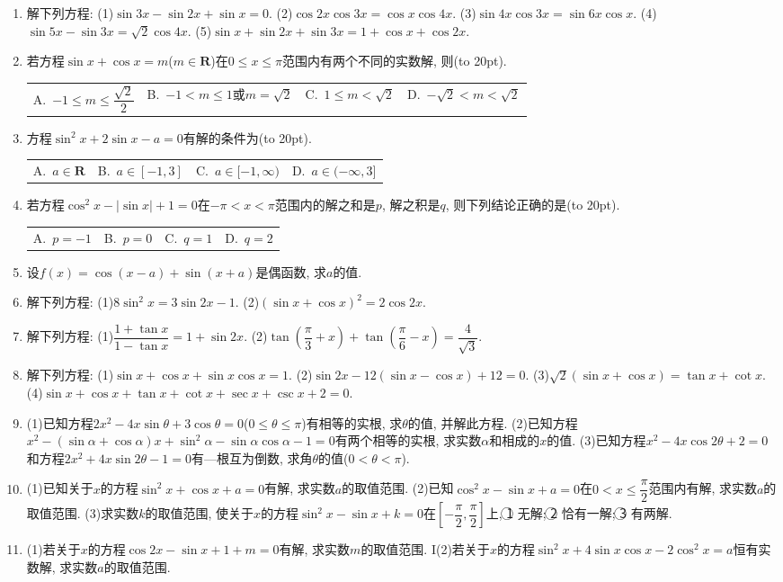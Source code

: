 \documentclass[10pt,a4paper]{article}
\newcommand{\blank}[1]{\underline{\hbox to #1pt{}}}
\newcommand{\bracket}[1]{(\hbox to #1pt{})}
\newcommand{\fourch}[4]{\par\begin{tabular}{p{.23\textwidth}p{.23\textwidth}p{.23\textwidth}p{.23\textwidth}}
A.~#1 &B.~#2& C.~#3& D.~#4
\end{tabular}}
\begin{document}
\begin{enumerate}[1.]
(6)$\sin x\cos x+1=\sin x+\cos x$:\blank{50}.
(7)$\sqrt 2\sin x=\sin 2x+\cos 2x$:\blank{50}.
(8)$\sin (x-\dfrac{\pi }6)\sin (x+\dfrac{\pi }6)=\dfrac 12$:\blank{50}.
\item 解下列方程:
(1)$\sin 3x-\sin 2x+\sin x=0$.			(2)$\cos 2x\cos 3x=\cos x\cos 4x$.
(3)$\sin 4x\cos 3x=\sin 6x\cos x$.			(4)$\sin 5x-\sin 3x=\sqrt 2\cos 4x$.
(5)$\sin x+\sin 2x+\sin 3x=1+\cos x+\cos 2x$.
\item 若方程$\sin x+\cos x=m$($m\in \mathbf{R}$)在$0\le x\le \pi$范围内有两个不同的实数解, 则\bracket{20}.
\fourch{$-1\le m\le \dfrac{\sqrt 2}2$}{$-1<m\le 1$或$m=\sqrt 2$}{$1\le m<\sqrt 2$}{$-\sqrt 2<m<\sqrt 2$}
\item 方程$\sin ^2x+2\sin x-a=0$有解的条件为\bracket{20}.
\fourch{$a\in \mathbf{R}$}{$a\in [-1,3]$}{$a\in [-1,\infty)$}{$a\in (-\infty ,3]$}
\item 若方程$\cos ^2x-|\sin x|+1=0$在$-\pi <x<\pi$范围内的解之和是$p$, 解之积是$q$, 则下列结论正确的是\bracket{20}.
\fourch{$p=-1$}{$p=0$}{$q=1$}{$q=2$}
\item 设$f(x)=\cos (x-a)+\sin (x+a)$是偶函数, 求$a$的值.
\item 解下列方程:
(1)$8\sin ^2x=3\sin 2x-1$.				(2)$(\sin x+\cos x)^2=2\cos 2x$.
\item 解下列方程:
(1)$\dfrac{1+\tan x}{1-\tan x}=1+\sin 2x$.				(2)$\tan (\dfrac{\pi }3+x)+\tan (\dfrac{\pi }6-x)=\dfrac 4{\sqrt 3}$.
\item 解下列方程:
(1)$\sin x+\cos x+\sin x\cos x=1$.
(2)$\sin 2x-12(\sin x-\cos x)+12=0$.
(3)$\sqrt 2(\sin x+\cos x)=\tan x+\cot x$.
(4)$\sin x+\cos x+\tan x+\cot x+\sec x+\csc x+2=0$.
\item (1)已知方程$2x^2-4x\sin \theta +3\cos \theta =0$($0\le \theta \le \pi$)有相等的实根, 求$\theta$的值, 并解此方程.
(2)已知方程$x^2-(\sin \alpha +\cos \alpha)x+\sin ^2\alpha -\sin \alpha \cos \alpha -1=0$有两个相等的实根, 求实数$\alpha$和相成的$x$的值.
(3)已知方程$x^2-4x\cos 2\theta +2=0$和方程$2x^2+4x\sin 2\theta -1=0$有—根互为倒数, 求角$\theta$的值($0<\theta <\pi$).
\item (1)已知关于$x$的方程$\sin ^2x+\cos x+a=0$有解, 求实数$a$的取值范围.
(2)已知$\cos ^2x-\sin x+a=0$在$0<x\le \dfrac{\pi }2$范围内有解, 求实数$a$的取值范围.
(3)求实数$k$的取值范围, 使关于$x$的方程$\sin ^2x-\sin x+k=0$在$[-\dfrac{\pi }2,\dfrac{\pi }2]$上, \textcircled{1} 无解; \textcircled{2} 恰有一解; \textcircled{3} 有两解.
\item (1)若关于$x$的方程$\cos 2x-\sin x+1+m=0$有解, 求实数$m$的取值范围.
I(2)若关于$x$的方程$\sin ^2x+4\sin x\cos x-2\cos ^2x=a$恒有实数解, 求实数$a$的取值范围.

\end{enumerate}
\end{document}
